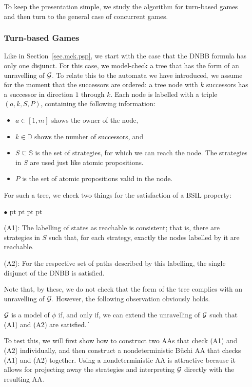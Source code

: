 \documentclass[11pt]{article}
\newcommand{\calg}{{\cal G}}
\newcommand{\bbbbd}{{\mathbb D}}
\newcommand{\bbbbs}{{\mathbb S}}
\def\qed{\ifmmode\|\else{\unskip\nobreak\hfil
\penalty50\hskip1em\null\nobreak\hfil$\blacksquare$
\parfillskip=0pt\finalhyphendemerits=0\endgraf}\fi}
\newenvironment{list1}{\begin{list}{$\bullet$}
{\topsep 0 pt \parsep 0 pt \partopsep 0 pt \itemsep 0 pt}}{\end{list}}
\begin{document}
To keep the presentation simple, we study the algorithm for turn-based games and then turn to the general case of concurrent games.

\subsubsection{Turn-based Games}
Like in Section~\ref{sec.mck.psp}, 
we start with the case that the DNBB formula has only one disjunct.
For this case, we model-check a tree that has the form 
of an unravelling of $\calg$.
To relate this to the automata we have introduced, 
we assume for the moment that the successors are ordered: 
a tree node with $k$ successors has a successor in direction $1$ through $k$.
Each node is labelled with a triple $(a,k,S,P)$, 
containing the following information:
\begin{itemize}
\item $a \in [1,m]$ shows the owner of the node,
\item $k \in \bbbbd$ shows the number of successors, and
\item $S\subseteq \bbbbs$ is the set of strategies, 
  for which we can reach the node.
  The strategies in $S$ are used just like atomic propositions.
\item $P$ is the set of atomic propositions valid in the node.
\end{itemize}
For such a tree, we check two things for the satisfaction of 
a BSIL property:
\begin{list1}
\item[(A1):] The labelling of states as reachable is consistent; 
  that is, there are strategies in $S$ such that, 
  for each strategy, exactly the nodes labelled by it are reachable.
\item[(A2):] For the respective set of paths described by this labelling, 
  the single disjunct of the DNBB is satisfied.
\end{list1}  
Note that, by these, we do not check that the form of 
the tree complies with an unravelling of $\calg$.
%
However, the following observation obviously holds.

{\lemma \label{lemma.A1.A2} 
$\calg$ is a model of $\phi$ if, and only if, 
we can extend the unravelling of $\calg$ such that (A1) and (A2) 
are satisfied.
} 
\qed 

To test this, we will first show how to construct two AAs that 
check (A1) and (A2) individually, and 
then construct a nondeterministic B\"uchi AA that checks (A1) and (A2) 
together.
Using a nondeterministic AA is attractive because it allows 
for projecting away the strategies and interpreting $\calg$ directly 
with the resulting AA.
\end{document}
